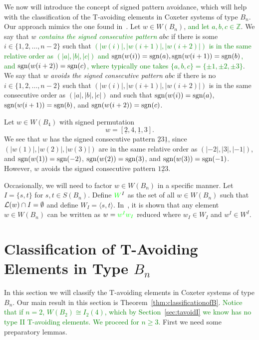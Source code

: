 We now will introduce the concept of signed pattern avoidance, which will help with the classification of the T-avoiding elements in Coxeter systems of type $B_n$. Our approach mimics the one found in~\cite{Gern2013a}. Let $w \in W(B_n)$, \textcolor{green}{and let $a,b,c \in \mathbb{Z}$}. We say that $w$ \emph{\textcolor{green}{contains the signed consecutive pattern}} $abc$ if there is some $i \in \{1,2, \ldots, n-2\}$ such that \textcolor{green}{$(|w(i)|,|w(i+1)|,|w(i+2)|)$ is in the same relative order as $(|a|,|b|,|c|)$ and $\mathrm{sgn}(w(i))=\mathrm{sgn}(a), \mathrm{sgn}(w(i+1))=\mathrm{sgn}(b)$, and $\mathrm{sgn}(w(i+2))=\mathrm{sgn}(c)$, where typically one takes $\{a,b,c\}=\{\pm1,\pm2,\pm3\}$}. We say that $w$ \emph{avoids the signed consecutive pattern} $abc$ if there is no $i \in \{1,2, \ldots, n-2\}$ such that $\left(|w(i)|, |w(i+1)|, |w(i+2)|\right)$ is in the same consecutive order as $\left(|a|, |b|, |c| \right)$ and such that $\mathrm{sgn}(w(i))=\mathrm{sgn}(a)$, $\mathrm{sgn}(w(i+1))=\mathrm{sgn}(b)$, and $\mathrm{sgn}(w(i+2))=\mathrm{sgn}(c)$.

\begin{example}
Let $w \in W(B_4)$ with signed permutation \[w=[\underline{2},4, \underline{1}, 3].\] We see that $w$ has the signed consecutive pattern $\underline{2} 3 \underline{1}$, since $(|w(1)|, |w(2)|, |w(3)|)$ are in the same relative order as $(|-2|, |3|, |-1|)$, and $\mathrm{sgn}(w(1))=\mathrm{sgn}(-2)$, $\mathrm{sgn}(w(2))=\mathrm{sgn}(3)$, and $\mathrm{sgn}(w(3))=\mathrm{sgn}(-1)$. However, $w$ avoids the signed consecutive pattern $1\underline{2}3$.
\end{example}

Occasionally, we will need to factor $w \in W(B_n)$ in a specific manner. Let $I=\{s,t\}$ for $s, t \in S(B_n)$. Define $\textcolor{green}{W}^I$ as the set of all $w \in W(B_n)$ such that $\mathcal{L}(w) \cap I= \emptyset$ and define $W_I=\langle s,t \rangle$. In~\cite{Humphreys1990}, it is shown that any element $w \in W(B_n)$ can be written as $w=\textcolor{green}{w^Iw_I}$ reduced where $w_I \in W_I$ and $w^I \in W^I$.

\section{Classification of T-Avoiding Elements in Type $B_n$}\label{sec:TAB}


In this section we will classify the T-avoiding elements in Coxeter systems of type $B_n$. Our main result in this section is Theorem~\ref{thm:classificationofB}. \textcolor{green}{Notice that if $n=2$, $W(B_2) \cong I_2(4)$, which by Section~\ref{sec:tavoidI} we know has no type II T-avoiding elements. We proceed for $n \geq 3$.} First we need some preparatory lemmas. 

